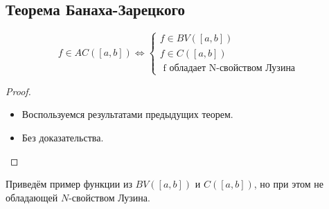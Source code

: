 \subsection{Теорема Банаха-Зарецкого}
\begin{theorem}
    $$
    f \in A C([a, b]) \Longleftrightarrow\left\{\begin{array}{l}
    f \in B V([a, b]) \\
    f \in C([a, b]) \\
    \text { f обладает N-свойством Лузина }
    \end{array}\right.
    $$
\end{theorem} 
\begin{proof}\tab
    \begin{itemize}
        \item[$\underline{\Longrightarrow}$] Воспользуемся результатами предыдущих теорем.
        \item[$\underline{\Longleftarrow}$] Без доказательства.
    \end{itemize}
    
\end{proof} 

Приведём пример функции из $BV([a,b])$ и $C([a,b])$, но при этом не обладающей $N$-свойством Лузина.

